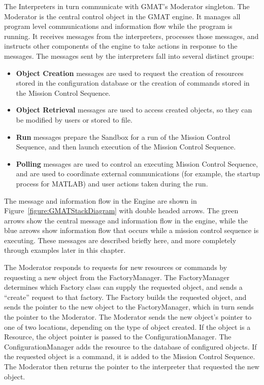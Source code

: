 The Interpreters in turn communicate with GMAT's Moderator singleton.  The Moderator is the central
control object in the GMAT engine.  It manages all program level communications and information flow
while the program is running.  It receives messages from the interpreters, processes those messages,
and instructs other components of the engine to take actions in response to the messages.  The
messages sent by the interpreters fall into several distinct groups:

\begin{itemize}
\item\textbf{Object Creation} messages are used to request the creation of resources stored in the
configuration database or the creation of commands stored in the Mission Control Sequence.
\item\textbf{Object Retrieval} messages are used to access created objects, so they can be modified
by users or stored to file.
\item\textbf{Run} messages prepare the Sandbox for a run of the Mission Control Sequence, and then
launch execution of the Mission Control Sequence.
\item\textbf{Polling} messages are used to control an executing Mission Control Sequence, and are
used to coordinate external communications (for example, the startup process for MATLAB) and user
actions taken during the run.
\end{itemize}

\noindent The message and information flow in the Engine are shown in
Figure~\ref{figure:GMATStackDiagram} with double headed arrows.  The green arrows show the central
message and information flow in the engine, while the blue arrows show information flow that occurs
while a mission control sequence is executing.  These messages are described briefly here, and more
completely through examples later in this chapter.

The Moderator responds to requests for new resources or commands by requesting a new object from the
FactoryManager.  The FactoryManager determines which Factory class can supply the requested object,
and sends a ``create'' request to that factory.  The Factory builds the requested object, and sends
the pointer to the new object to the FactoryManager, which in turn sends the pointer to the
Moderator.  The Moderator sends the new object's pointer to one of two locations, depending on the
type of object created.  If the object is a Resource, the object pointer is passed to the
ConfigurationManager.  The ConfigurationManager adds the resource to the database of configured
objects.  If the requested object is a command, it is added to the Mission Control Sequence.  The
Moderator then returns the pointer to the interpreter that requested the new object.

